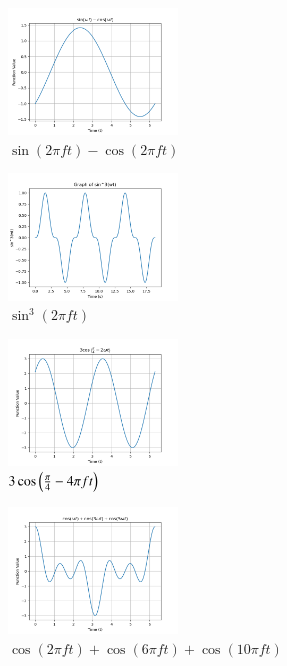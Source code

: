 \documentclass[journal,12pt,twocolumn]{IEEEtran}
\theoremstyle{remark}
\begin{document}
 \renewcommand{\thefigure}{\theenumi}
 \renewcommand{\thetable}{\theenumi}
 
 
 \begin{figure}[h!]
    \centering
    \includegraphics[width=0.4\textwidth]{figs/a1_fig1.png}
    \caption{$\sin(2\pi f t)- \cos(2\pi ft)$}
\end{figure}
 \begin{figure}[h!]
    \centering
    \includegraphics[width=0.4\textwidth]{figs/a1_fig2.png}
    \caption{$\sin^3(2\pi f t)$}
\end{figure}
\newpage
\begin{figure}[h!]
    \centering
    \includegraphics[width=0.4\textwidth]{figs/a1_fig3.png}
    \caption{$3\cos\left(\frac{\pi}{4}- 4\pi f t\right)$}
\end{figure}
\begin{figure}[h!]
    \centering
    \includegraphics[width=0.4\textwidth]{figs/a1_fig4.png}
    \caption{$\cos(2\pi f t)+\cos(6\pi  f t)+\cos(10\pi  f t)$}
\end{figure}
\end{document}
